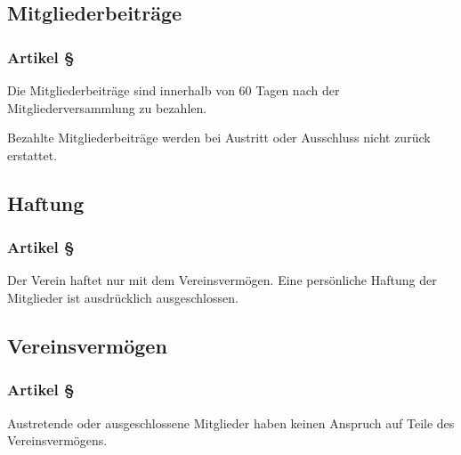 \subsection{Mitgliederbeiträge}

\subsubsection*{Artikel §\articlenumber}
Die Mitgliederbeiträge sind innerhalb von 60 Tagen nach der 
Mitgliederversammlung zu bezahlen.

Bezahlte Mitgliederbeiträge werden bei Austritt oder 
Ausschluss nicht zurück erstattet.

\subsection{Haftung}

\subsubsection*{Artikel §\articlenumber}
Der Verein haftet nur mit dem Vereinsvermögen. Eine
persönliche Haftung der Mitglieder ist ausdrücklich
ausgeschlossen.

\subsection{Vereinsvermögen}

\subsubsection*{Artikel §\articlenumber}
Austretende oder ausgeschlossene Mitglieder haben keinen 
Anspruch auf Teile des Vereinsvermögens.
